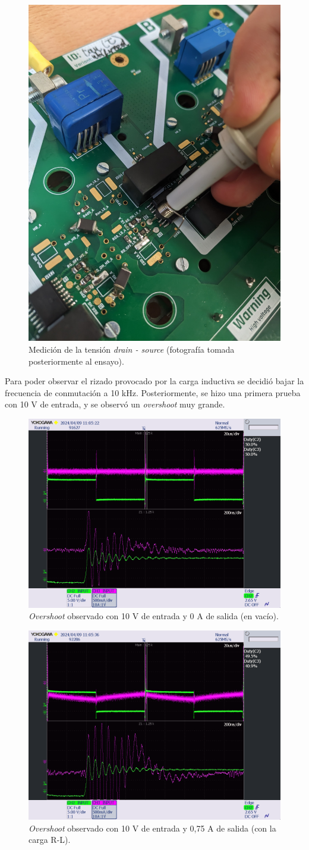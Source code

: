 \begin{figure}[H]
	\centering
	\includegraphics[width=0.45\linewidth]{fig/pigtail2}
	\caption{Medición de la tensión \textit{drain - source} (fotografía tomada posteriormente al ensayo).}
\end{figure}

Para poder observar el rizado provocado por la carga inductiva se decidió bajar la frecuencia de conmutación a 10 kHz. Posteriormente, se hizo una primera prueba con 10 V de entrada, y se observó un \textit{overshoot} muy grande.

\begin{figure}[H]
	\centering
	\includegraphics[width=0.7\linewidth]{fig/overshootInicial1}
	\caption{\textit{Overshoot} observado con 10 V de entrada y 0 A de salida (en vacío).}
\end{figure}

\begin{figure}[H]
	\centering
	\includegraphics[width=0.7\linewidth]{fig/overshootInicial2}
	\caption{\textit{Overshoot} observado con 10 V de entrada y 0,75 A de salida (con la carga R-L).}
\end{figure}

